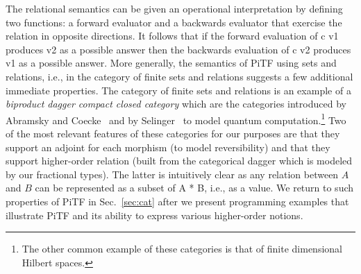 \documentclass{llncs}
\newcommand{\roshan}[1]{\textsc{Roshan says:} 
  \textit{#1}
}
\begin{document}
The relational semantics can be given an operational interpretation by
defining two functions: a forward evaluator and a backwards evaluator that
exercise the relation in opposite directions. It follows that if the forward
evaluation of {{c v1}} produces {{v2}} as a possible answer then the
backwards evaluation of {{c v2}} produces {{v1}} as a possible answer. More
generally, the semantics of {{PiTF}} using sets and relations, i.e., in the
category of finite sets and relations suggests a few additional immediate
properties.  The category of finite sets and relations is an example of a
\emph{biproduct dagger compact closed category} which are the categories
introduced by Abramsky and Coecke~\cite{Abramsky:2004:CSQ:1018438.1021878}
and by Selinger~\cite{Selinger:2007:DCC:1229185.1229207} to model quantum
computation.\footnote{The other common example of these categories is that of
  finite dimensional Hilbert spaces.} Two of the most relevant features of
these categories for our purposes are that they support an adjoint for each
morphism (to model reversibility) and that they support higher-order relation
(built from the categorical dagger which is modeled by our fractional
types). The latter is intuitively clear as any relation between $A$ and $B$
can be represented as a subset of {{A * B}}, i.e., as a value. We return to
such properties of {{PiTF}} in Sec.~\ref{sec:cat} after we present
programming examples that illustrate {{PiTF}} and its ability to express
various higher-order notions.




\end{document}
